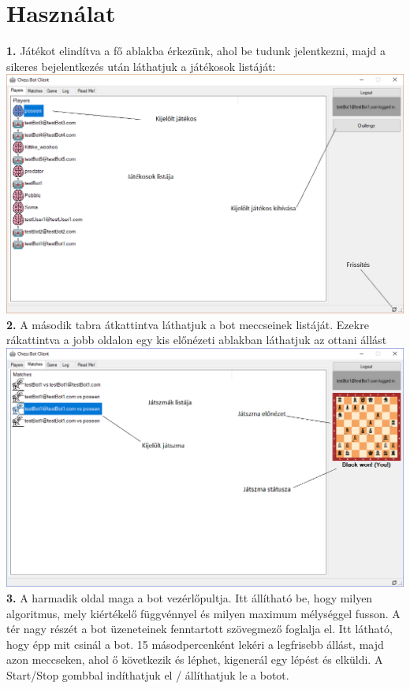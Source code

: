 \documentclass[twoside, a4paper, 12pt]{book}
\begin{document}
\section{Használat}
\noindent \textbf{1.} Játékot elindítva a fő ablakba érkezünk, ahol be tudunk jelentkezni, majd a sikeres bejelentkezés után láthatjuk a játékosok listáját: \\
\includegraphics[width=1.0\textwidth]{img/botClient_1.png} \\
\newpage
\noindent \textbf{2.} A második tabra átkattintva láthatjuk a bot meccseinek listáját. Ezekre rákattintva a jobb oldalon egy kis előnézeti ablakban láthatjuk az ottani állást \\
\includegraphics[width=1.0\textwidth]{img/botClient_2.png} \\
\newpage
\noindent \textbf{3.} A harmadik oldal maga a bot vezérlőpultja. Itt állítható be, hogy milyen algoritmus, mely kiértékelő függvénnyel és milyen maximum mélységgel fusson. A tér nagy részét a bot üzeneteinek fenntartott szövegmező foglalja el. Itt látható, hogy épp mit csinál a bot. 15 másodpercenként lekéri a legfrisebb állást, majd azon meccseken, ahol ő következik és léphet, kigenerál egy lépést és elküldi. A Start/Stop gombbal indíthatjuk el / állíthatjuk le a botot. \\
\end{document}
